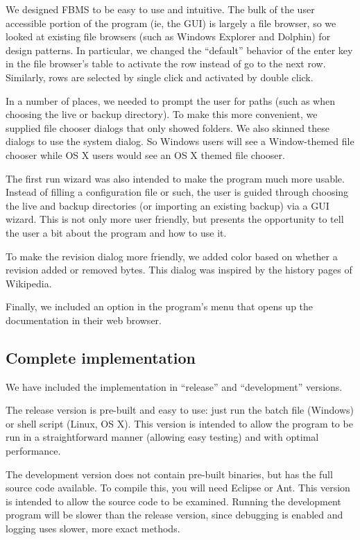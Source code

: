 \documentclass[12pt,a4paper]{article}
\begin{document}
We designed FBMS to be easy to use and intuitive. The bulk of the user accessible portion of the program (ie, the GUI) is largely a file browser, so we looked at existing file browsers (such as Windows Explorer\cite{explorer} and Dolphin\cite{dolphin}) for design patterns. In particular, we changed the ``default'' behavior of the enter key in the file browser's table to activate the row instead of go to the next row. Similarly, rows are selected by single click and activated by double click.

In a number of places, we needed to prompt the user for paths (such as when choosing the live or backup directory). To make this more convenient, we supplied file chooser dialogs that only showed folders. We also skinned these dialogs to use the system dialog. So Windows users will see a Window-themed file chooser while OS X users would see an OS X themed file chooser.

The first run wizard was also intended to make the program much more usable. Instead of filling a configuration file or such, the user is guided through choosing the live and backup directories (or importing an existing backup) via a GUI wizard. This is not only more user friendly, but presents the opportunity to tell the user a bit about the program and how to use it.

To make the revision dialog more friendly, we added color based on whether a revision added or removed bytes. This dialog was inspired by the history pages of Wikipedia\cite{wikipedia}.

Finally, we included an option in the program's menu that opens up the documentation in their web browser.

\subsection{Complete implementation}
We have included the implementation in ``release'' and ``development'' versions.

The release version is pre-built and easy to use: just run the batch file (Windows) or shell script (Linux, OS X). This version is intended to allow the program to be run in a straightforward manner (allowing easy testing) and with optimal performance.

The development version does not contain pre-built binaries, but has the full source code available. To compile this, you will need Eclipse\cite{eclipse} or Ant\cite{ant}. This version is intended to allow the source code to be examined. Running the development program will be slower than the release version, since debugging is enabled and logging uses slower, more exact methods.
\end{document}
